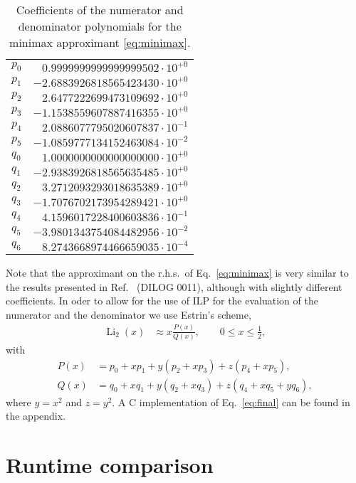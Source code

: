 \documentclass[10pt,DIV16,twocolumn,numbers=noenddot]{scrartcl}
\newcommand{\Li}{\operatorname{Li}_2}
\begin{document}
\begin{table}[t]
  \centering
  \caption{Coefficients of the numerator and denominator polynomials
    for the minimax approximant \eqref{eq:minimax}.}
  \begin{tabular}{lr}
    \toprule
    $p_0$ & $ 0.9999999999999999502\cdot 10^{+0}$ \\
    $p_1$ & $-2.6883926818565423430\cdot 10^{+0}$ \\
    $p_2$ & $ 2.6477222699473109692\cdot 10^{+0}$ \\
    $p_3$ & $-1.1538559607887416355\cdot 10^{+0}$ \\
    $p_4$ & $ 2.0886077795020607837\cdot 10^{-1}$ \\
    $p_5$ & $-1.0859777134152463084\cdot 10^{-2}$ \\
    $q_0$ & $ 1.0000000000000000000\cdot 10^{+0}$ \\
    $q_1$ & $-2.9383926818565635485\cdot 10^{+0}$ \\
    $q_2$ & $ 3.2712093293018635389\cdot 10^{+0}$ \\
    $q_3$ & $-1.7076702173954289421\cdot 10^{+0}$ \\
    $q_4$ & $ 4.1596017228400603836\cdot 10^{-1}$ \\
    $q_5$ & $-3.9801343754084482956\cdot 10^{-2}$ \\
    $q_6$ & $ 8.2743668974466659035\cdot 10^{-4}$ \\
    \bottomrule
  \end{tabular}
  \label{tab:coeffs}
\end{table}
%
Note that the approximant on the r.h.s.\ of Eq.~\eqref{eq:minimax} is
very similar to the results presented in Ref.~\cite{morris} (DILOG
0011), although with slightly different coefficients.  In oder to
allow for the use of ILP for the evaluation of the numerator and the
denominator we use Estrin's scheme,
%
\begin{align}
  \Li(x) &\approx x\frac{P(x)}{Q(x)}, \qquad 0\leq x \leq \frac{1}{2},
  \label{eq:final}
\end{align}
%
with
%
\begin{align}
  P(x) &= p_0 + x p_1 + y (p_2 + x p_3) + z (p_4 + x p_5), \\
  Q(x) &= q_0 + x q_1 + y (q_2 + x q_3) + z (q_4 + x q_5 + y q_6),
\end{align}
%
where $y=x^2$ and $z=y^2$.  A C implementation of Eq.~\eqref{eq:final}
can be found in the appendix.

\section{Runtime comparison}
\end{document}
